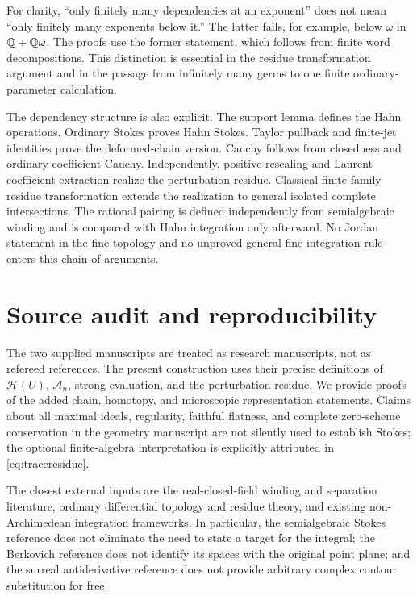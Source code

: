 \documentclass[11pt,letterpaper]{article}
\theoremstyle{definition}
\theoremstyle{remark}
\newcommand{\HH}{\mathcal H}\newcommand{\A}{\mathscr A}\newcommand{\OO}{\mathcal O}
\numberwithin{equation}{section}
\begin{document}
For clarity, ``only finitely many dependencies at an exponent'' does not mean ``only finitely many exponents below it.'' The latter fails, for example, below $\omega$ in $\mathbb Q+\mathbb Q\omega$. The proofs use the former statement, which follows from finite word decompositions. This distinction is essential in the residue transformation argument and in the passage from infinitely many germs to one finite ordinary-parameter calculation.

The dependency structure is also explicit. The support lemma defines the Hahn operations. Ordinary Stokes proves Hahn Stokes. Taylor pullback and finite-jet identities prove the deformed-chain version. Cauchy follows from closedness and ordinary coefficient Cauchy. Independently, positive rescaling and Laurent coefficient extraction realize the perturbation residue. Classical finite-family residue transformation extends the realization to general isolated complete intersections. The rational pairing is defined independently from semialgebraic winding and is compared with Hahn integration only afterward. No Jordan statement in the fine topology and no unproved general fine integration rule enters this chain of arguments.

\section{Source audit and reproducibility}\label{app:audit}
The two supplied manuscripts are treated as research manuscripts, not as refereed references. The present construction uses their precise definitions of $\HH(U)$, $\A_n$, strong evaluation, and the perturbation residue. We provide proofs of the added chain, homotopy, and microscopic representation statements. Claims about all maximal ideals, regularity, faithful flatness, and complete zero-scheme conservation in the geometry manuscript are not silently used to establish Stokes; the optional finite-algebra interpretation is explicitly attributed in \cref{eq:traceresidue}.

The closest external inputs are the real-closed-field winding and separation literature, ordinary differential topology and residue theory, and existing non-Archimedean integration frameworks. In particular, the semialgebraic Stokes reference does not eliminate the need to state a target for the integral; the Berkovich reference does not identify its spaces with the original point plane; and the surreal antiderivative reference does not provide arbitrary complex contour substitution for free.
\end{document}
